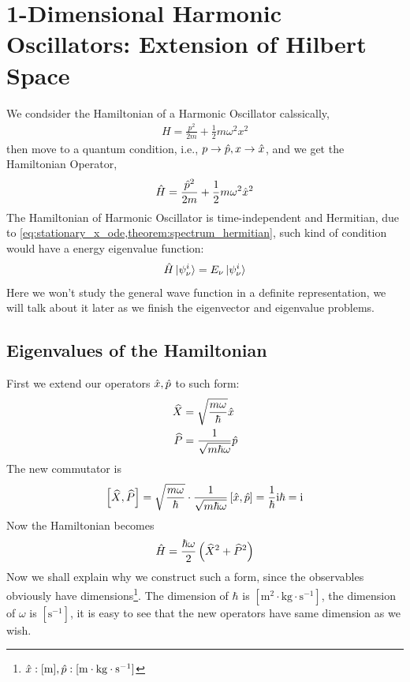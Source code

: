 \section{1-Dimensional Harmonic Oscillators: Extension of Hilbert Space}
We condsider the Hamiltonian of a Harmonic Oscillator calssically, 
\begin{eqnarray}
    H = \frac{p^2}{2m} + \frac{1}{2} m \omega^2 x^2
\end{eqnarray}
then move to a quantum condition, i.e., $p \rightarrow \hat{p}, x \rightarrow \hat{x}$, and we get the Hamiltonian Operator,
\begin{eqnarray}
    \hat{H} = \frac{\hat{p}^2}{2m} + \frac{1}{2} m \omega^2 \hat{x}^2
\end{eqnarray}
The Hamiltonian of Harmonic Oscillator is time-independent and Hermitian, due to \cref{eq:stationary_x_ode,theorem:spectrum_hermitian}, such kind of condition would have a energy eigenvalue function: 
\begin{align}
    \hat{H} \ket{\psi_ \nu^i} = E_ \nu \ket{\psi_ \nu^i} \label{eq:SHO_eigenvalue_equation}
\end{align}
Here we won't study the general wave function in a definite representation, we will talk about it later as we finish the eigenvector and eigenvalue problems. 

\subsection{Eigenvalues of the Hamiltonian}
First we extend our operators $\hat{x},\hat{p}$ to such form: 
\begin{align}
    \widehat{X} &= \sqrt{\frac{m \omega}{\hbar}} \hat{x} \\
    \widehat{P} &= \frac{1}{\sqrt{m \hbar \omega}} \hat{p}
\end{align}
The new commutator is 
\begin{align}
    \left[ \widehat{X} , \widehat{P} \right] = \sqrt{\frac{m \omega}{\hbar}} \cdot \frac{1}{\sqrt{m \hbar \omega}} \left[ \hat{x} , \hat{p} \right] = \frac{1}{\hbar} \mathrm{i} \hbar = \mathrm{i}
\end{align}
Now the Hamiltonian becomes
\begin{align}
    \hat{H} = \frac{\hbar \omega}{2} \left(\widehat{X}^2 + \widehat{P}^2\right) \label{eq:Hamiltonian_SHO_xp}
\end{align}
Now we shall explain why we construct such a form, since the observables obviously have dimensions\footnote{$\hat{x}:[\mathrm{m}],\hat{p}:[\mathrm{m \cdot kg \cdot s^{-1}}]$}. The dimension of $\hbar$ is $[\mathrm{m^2 \cdot kg \cdot s^{-1}}]$, the dimension of $\omega$ is $[\mathrm{s^{-1}}]$, it is easy to see that the new operators have same dimension as we wish.

